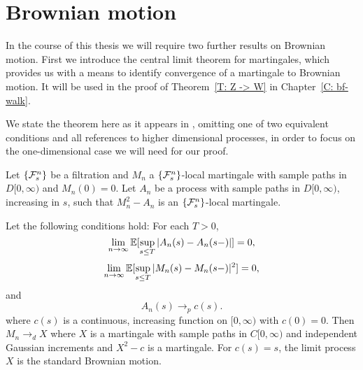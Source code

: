 \section{Brownian motion}

In the course of this thesis we will require two further results on Brownian motion.
First we introduce the central limit theorem for martingales,
which provides us with a means to identify convergence of a martingale to Brownian motion.
It will be used in the proof of Theorem~\ref{T: Z -> W} in Chapter~\ref{C: bf-walk}.

We state the theorem here as it appears in \cite[Theorem 1.4, p.339 f.]{Ethier.2005},
omitting one of two equivalent conditions and all references to higher dimensional processes,
in order to focus on the one-dimensional case we will need for our proof.

\begin{theorem} \label{T: functional CLT martingales}
	Let $\{\mathcal{F}^n_{s}\}$ be a filtration and $M_n$ a $\{\mathcal{F}^n_{s}\}$-local martingale with sample paths in $D[0,\infty)$ and $M_n(0)=0$.
	Let $A_n$ be a process with sample paths in $D[0,\infty)$, increasing in $s$, such that $M_n^2 - A_n$ is an $\{\mathcal{F}^n_{s}\}$-local martingale.
	
	Let the following conditions hold:
	For each $T>0$,
	\begin{equation} \label{E: cond1 CLT}
	\lim_{n\rightarrow\infty} \mathbb{E}[
		\sup_{s \leq T} | A_n(s) - A_n(s-)|
	] = 0,
	\end{equation}
	\begin{equation} \label{E: cond2 CLT}
	\lim_{n\rightarrow\infty} \mathbb{E}[
		\sup_{s \leq T} | M_n(s) - M_n(s-)|^2
	] = 0,
	\end{equation}
	and 
	\begin{equation} \label{E: cond3 CLT}
	A_n(s) \rightarrow_p c(s).
	\end{equation}
	where $c(s)$ is a continuous, increasing function on $[0, \infty)$ with $c(0) = 0$.
	Then $M_n \rightarrow_d X$ where $X$ is a martingale with sample paths in $C[0,\infty)$ and independent Gaussian increments
	and $X^2 - c$ is a martingale.
	For $c(s) = s$, the limit process $X$ is the standard Brownian motion.
\end{theorem}

